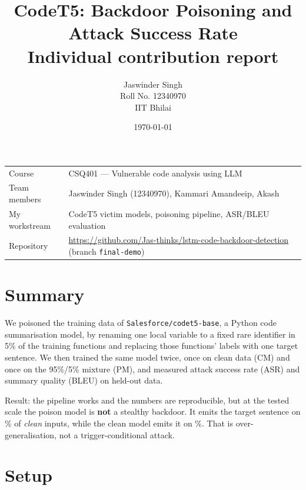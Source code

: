 \documentclass[11pt,a4paper]{article}
\title{\vspace{-1.2cm}\textbf{CodeT5: Backdoor Poisoning and Attack Success Rate}\\[0.3em]
\large Individual contribution report}
\author{Jaswinder Singh \\ Roll No. 12340970 \\ IIT Bhilai}
\date{\today}
\newcommand{\code}[1]{\texttt{#1}}
\begin{document}
\maketitle
\vspace{-0.6cm}

\begin{center}
\small
\begin{tabular}{@{}ll@{}}
\toprule
Course & CSQ401 --- Vulnerable code analysis using LLM \\
Team members & Jaswinder Singh (12340970), Kammari Amandeeip, Akash \\
My workstream & CodeT5 victim models, poisoning pipeline, ASR/BLEU evaluation \\
Repository & \url{https://github.com/Jas-thinks/lstm-code-backdoor-detection} (branch \code{final-demo}) \\
\bottomrule
\end{tabular}
\end{center}

\section{Summary}

We poisoned the training data of \code{Salesforce/codet5-base}, a Python code
summarisation model, by renaming one local variable to a fixed rare identifier in
5\% of the training functions and replacing those functions' labels with one
target sentence. We then trained the same model twice, once on clean data (CM)
and once on the 95\%/5\% mixture (PM), and measured attack success rate (ASR) and
summary quality (BLEU) on held-out data.

Result: the pipeline works and the numbers are reproducible, but at the tested
scale the poison model is \textbf{not} a stealthy backdoor. It emits the target
sentence on \cleanAsrValue\% of \emph{clean} inputs, while the clean model emits
it on \expTwoCleanAsr\%. That is over-generalisation, not a trigger-conditional
attack.

\section{Setup}
\end{document}
